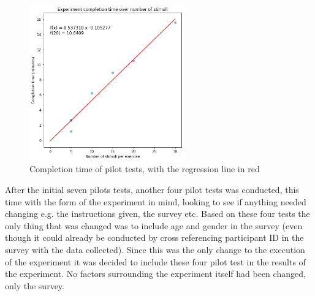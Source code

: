 \begin{figure}[h!]
    \centering
    \includegraphics[width=0.6\textwidth]{figures/comp_time.png}
    \caption{Completion time of pilot tests, with the regression line in red}
    \label{pilot}
\end{figure}

After the initial seven pilots tests, another four pilot tests was conducted, this time with the form of the experiment in mind, looking to see if anything needed changing e.g. the instructions given, the survey etc. Based on these four tests the only thing that was changed was to include age and gender in the survey (even though it could already be conducted by cross referencing participant ID in the survey with the data collected). Since this was the only change to the execution of the experiment it was decided to include these four pilot test in the results of the experiment. No factors surrounding the experiment itself had been changed, only the survey.